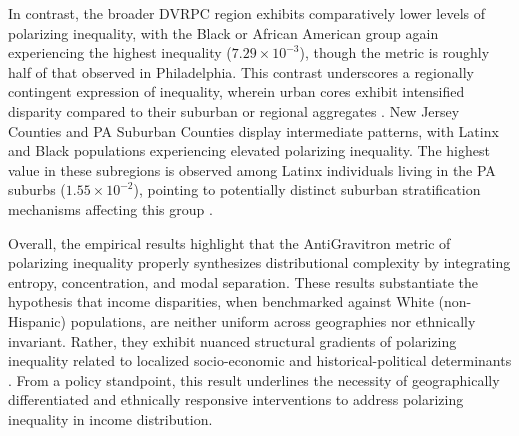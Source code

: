 \documentclass[11pt]{article}
\begin{document}
In contrast, the broader DVRPC region exhibits comparatively lower levels of polarizing inequality, with the Black or African American group again experiencing the highest inequality ($7.29 \times 10^{-3}$), though the metric is roughly half of that observed in Philadelphia. This contrast underscores a regionally contingent expression of inequality, wherein urban cores exhibit intensified disparity compared to their suburban or regional aggregates \citep{reardon2004patterns}. New Jersey Counties and PA Suburban Counties display intermediate patterns, with Latinx and Black populations experiencing elevated polarizing inequality. The highest value in these subregions is observed among Latinx individuals living in the PA suburbs ($1.55 \times 10^{-2}$), pointing to potentially distinct suburban stratification mechanisms affecting this group \citep{bailey2017structural}.

Overall, the empirical results highlight that the AntiGravitron metric of polarizing inequality properly synthesizes distributional complexity by integrating entropy, concentration, and modal separation. These results substantiate the hypothesis that income disparities, when benchmarked against White (non-Hispanic) populations, are neither uniform across geographies nor ethnically invariant. Rather, they exhibit nuanced structural gradients of polarizing inequality related to localized socio-economic and historical-political determinants \citep{massey2009origins}. From a policy standpoint, this result underlines the necessity of geographically differentiated and ethnically responsive interventions to address polarizing inequality in income distribution.
\end{document}
